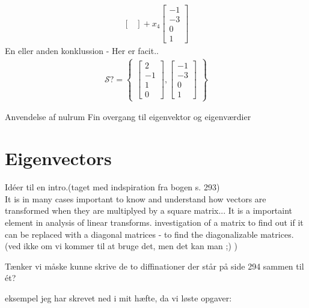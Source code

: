 \begin{example}
\begin{align*}
\begin{bmatrix}
\end{bmatrix} + x_4
\begin{bmatrix}
   -1\\ -3\\ 0\\ 1
\end{bmatrix}
\end{align*}
En eller anden konklussion - Her er facit..
\begin{align*}
\mathcal{S?} = 
\begin{Bmatrix}
\begin{bmatrix}
   2\\ -1\\ 1 \\0
\end{bmatrix},
\begin{bmatrix}
   -1\\ -3\\ 0\\ 1
\end{bmatrix}
\end{Bmatrix}
\end{align*}
\end{example}

Anvendelse af nulrum
Fin overgang til eigenvektor og eigenværdier

\section{Eigenvectors}
Idéer til en intro.(taget med indspiration fra bogen s. 293)\\
It is in many cases important to know and understand how vectors are transformed when they are multiplyed by a square matrix... 
It is a importaint element in analysis of linear transforms.
investigation of a matrix to find out if it can be replaced with a diagonal matrices - to find the diagonalizable matrices. (ved ikke om vi kommer til at bruge det, men det kan man ;) )

\begin{definition}
Tænker vi måske kunne skrive de to diffinationer der står på side 294 sammen til ét? 
\end{definition}

eksempel jeg har skrevet ned i mit hæfte, da vi løste opgaver:\\

